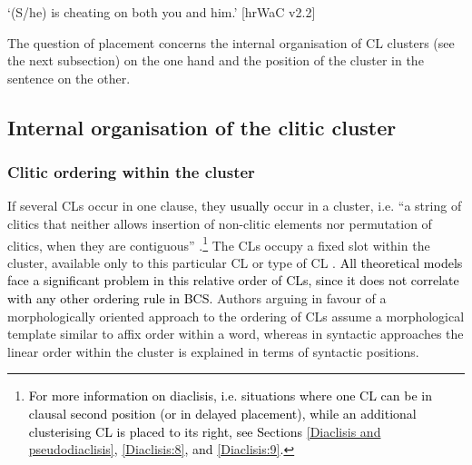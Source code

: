 \begin{exe}\ex
\begin{xlist}
\end{xlist}
\glt ‘(S/he) is cheating on both you and him.’ 
\hfill [hrWaC v2.2]
\end{exe}

\noindent The question of placement concerns the internal organisation of CL clusters (see the next subsection) on the one hand and the position of the cluster in the sentence on the other. 

\subsection{Internal organisation of the clitic cluster}
\label{Internal organisation of the clitic cluster}
\subsubsection{Clitic ordering within the cluster}
\label{Clitic ordering within the cluster}
\label{Approaches to clusters: syntax vs morphology}
If several CLs occur in one clause, they \textcolor{black}{usually} occur in a cluster, i.e. ``a string of clitics that neither allows insertion of non-clitic elements nor permutation of clitics, when they are contiguous'' \citep[181]{ZimmerlingKosta13}.\footnote{\textcolor{black}{For more information on diaclisis, i.e. situations where one CL can be in clausal second position (or in delayed placement), while an additional clusterising CL is placed to its right, see Sections \ref{Diaclisis and pseudodiaclisis}, \ref{Diaclisis:8}, and \ref{Diaclisis:9}.}} The CLs occupy a fixed slot within the cluster, available only to this particular CL or type of CL \citep[182]{ZimmerlingKosta13}.
\textcolor{black}{All theoretical models face a significant problem in this relative order of CLs, since it does not correlate with any other ordering rule in BCS.}
Authors arguing in favour of a morphologically oriented approach to the ordering of CLs assume a morphological template similar to affix order within a word, whereas in syntactic approaches the linear order within the cluster is explained in terms of syntactic positions. 

